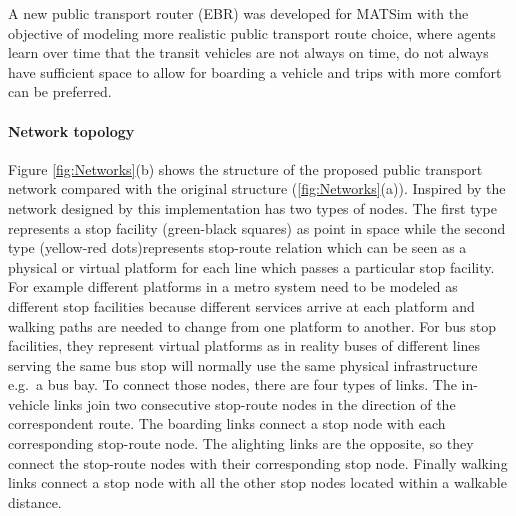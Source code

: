 A new public transport router (EBR) was developed for MATSim with the objective of modeling more realistic public transport route choice, where agents learn over time that the transit vehicles are not always on time, do not always have sufficient space to allow for boarding a vehicle and trips with more comfort can be preferred.

\paragraph{Network topology}

Figure \ref{fig:Networks}(b) shows the structure of the proposed public transport network compared with the original structure (\ref{fig:Networks}(a)). Inspired by the network designed by \citet{SpiessFlorian_TransResB_1989} this implementation has two types of nodes. The first type represents a stop facility (green-black squares) as point in space while the second type (yellow-red dots)represents stop-route relation which can be seen as a physical or virtual platform for each line which passes a particular stop facility. For example different platforms in a metro system need to be modeled as different stop facilities because different services arrive at each platform and walking paths are needed to change from one platform to another. For bus stop facilities, they represent virtual platforms as in reality buses of different lines serving the same bus stop will normally use the same physical infrastructure e.g.\ a bus bay. To connect those nodes, there are four types of links. The in-vehicle links join two consecutive stop-route nodes in the direction of the correspondent route. The boarding links connect a stop node with each corresponding stop-route node. The alighting links are the opposite, so they connect the stop-route nodes with their corresponding stop node. Finally walking links connect a stop node with all the other stop nodes located within a walkable distance.

